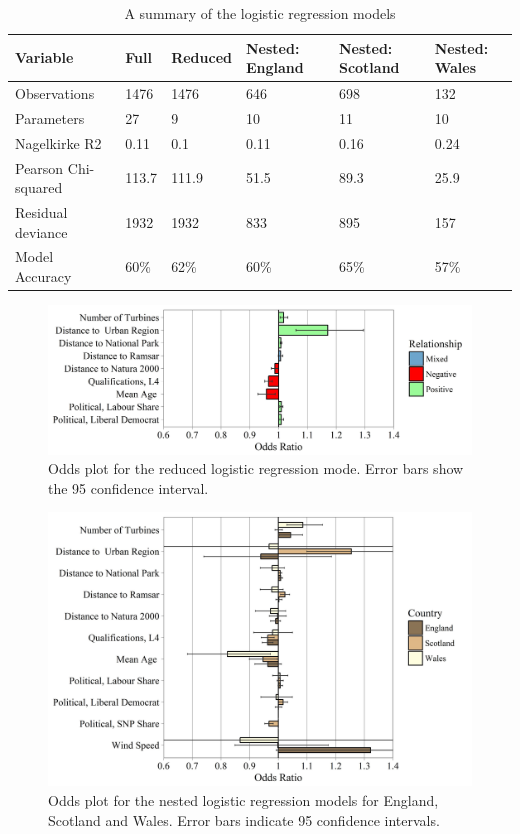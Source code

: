 \documentclass[a4paper,]{article}
\theoremstyle{definition}
\theoremstyle{definition}
\theoremstyle{remark}
\begin{document}
{\begin{table}

\caption{\label{tab:ModelsSummary}A summary of the logistic regression models}
\centering
\begin{tabular}[t]{llllll}
\toprule
Variable & Full & Reduced & Nested:
England & Nested:
Scotland & Nested:
Wales\\
\midrule
Observations & 1476 & 1476 & 646 & 698 & 132\\
Parameters & 27 & 9 & 10 & 11 & 10\\
Nagelkirke R2 & 0.11 & 0.1 & 0.11 & 0.16 & 0.24\\
Pearson Chi-squared & 113.7 & 111.9 & 51.5 & 89.3 & 25.9\\
Residual deviance & 1932 & 1932 & 833 & 895 & 157\\
Model Accuracy & 60\% & 62\% & 60\% & 65\% & 57\%\\
\bottomrule
\end{tabular}
\end{table}

\begin{figure}
\includegraphics[width=1\linewidth]{figures/OddsPlotReduced} \caption{Odds plot for the reduced logistic regression mode. Error bars show the 95 confidence interval.}\label{fig:OddsPlotReduced}
\end{figure}

\begin{figure}
\includegraphics[width=1\linewidth]{figures/OddsPlotSegmented} \caption{Odds plot for the nested logistic regression models for England, Scotland and Wales. Error bars indicate 95 confidence intervals.}\label{fig:OddsPlotSegmented}
\end{figure}

}
\end{document}
